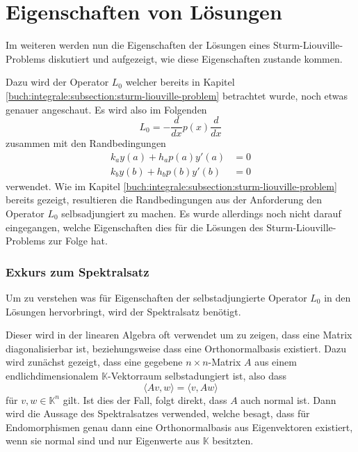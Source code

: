 %
%
%
\section{Eigenschaften von Lösungen
\label{sturmliouville:section:solution-properties}}

Im weiteren werden nun die Eigenschaften der Lösungen eines
Sturm-Liouville-Problems diskutiert und aufgezeigt, wie diese Eigenschaften
zustande kommen.

Dazu wird der Operator $L_0$ welcher bereits in Kapitel
\ref{buch:integrale:subsection:sturm-liouville-problem} betrachtet wurde,
noch etwas genauer angeschaut.
Es wird also im Folgenden
\[
    L_0
    =
    -\frac{d}{dx}p(x)\frac{d}{dx}
\]
zusammen mit den Randbedingungen
\[
    \begin{aligned}
        k_a y(a) + h_a p(a) y'(a) &= 0 \\
        k_b y(b) + h_b p(b) y'(b) &= 0
    \end{aligned}
\]
verwendet.
Wie im Kapitel
\ref{buch:integrale:subsection:sturm-liouville-problem} bereits gezeigt,
resultieren die Randbedingungen aus der Anforderung den Operator $L_0$
selbsadjungiert zu machen.
Es wurde allerdings noch nicht darauf eingegangen, welche Eigenschaften dies
für die Lösungen des Sturm-Liouville-Problems zur Folge hat.

\subsubsection{Exkurs zum Spektralsatz}

Um zu verstehen was für Eigenschaften der selbstadjungierte Operator $L_0$ in 
den Lösungen hervorbringt, wird der Spektralsatz benötigt.

Dieser wird in der linearen Algebra oft verwendet um zu zeigen, dass eine Matrix
diagonalisierbar ist, beziehungsweise dass eine Orthonormalbasis existiert.
Dazu wird zunächst gezeigt, dass eine gegebene $n\times n$-Matrix $A$ aus einem
endlichdimensionalem $\mathbb{K}$-Vektorraum selbstadungiert ist, also dass
\[
    \langle Av, w \rangle
    =
    \langle v, Aw \rangle
\]
für $ v, w \in \mathbb{K}^n$ gilt.
Ist dies der Fall, folgt direkt, dass $A$ auch normal ist.
Dann wird die Aussage des Spektralsatzes
\cite{sturmliouville:spektralsatz-wiki} verwended, welche besagt, dass für
Endomorphismen genau dann eine Orthonormalbasis aus Eigenvektoren existiert,
wenn sie normal sind und nur Eigenwerte aus $\mathbb{K}$ besitzten.

